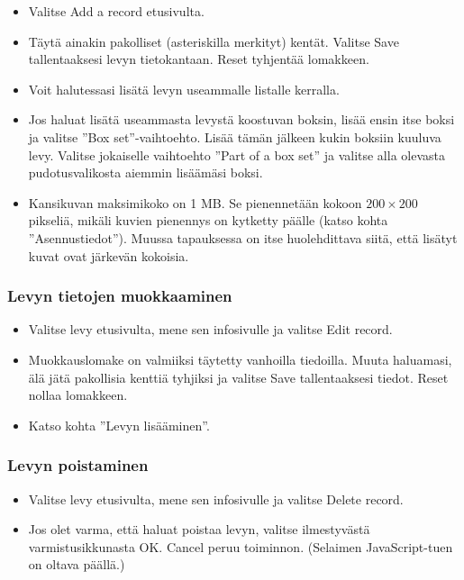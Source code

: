 \documentclass[a4paper,12pt]{report}
\begin{document}
\begin{itemize}
  \item Valitse Add a record etusivulta.
  \item Täytä ainakin pakolliset (asteriskilla merkityt) kentät. Valitse
    Save tallentaaksesi levyn tietokantaan. Reset tyhjentää lomakkeen.
  \item Voit halutessasi lisätä levyn useammalle listalle kerralla.
  \item Jos haluat lisätä useammasta levystä koostuvan boksin, lisää
    ensin itse boksi ja valitse ''Box set''-vaihtoehto. Lisää tämän
    jälkeen kukin boksiin kuuluva levy. Valitse jokaiselle vaihtoehto
    ''Part of a box set'' ja valitse alla olevasta pudotusvalikosta
    aiemmin lisäämäsi boksi.
  \item Kansikuvan maksimikoko on 1 MB. Se pienennetään kokoon
    $200\times200$ pikseliä, mikäli kuvien pienennys on kytketty päälle
    (katso kohta ''Asennustiedot''). Muussa tapauksessa on itse
    huolehdittava siitä, että lisätyt kuvat ovat järkevän kokoisia.
\end{itemize}
		
\subsubsection{Levyn tietojen muokkaaminen}

\begin{itemize}
  \item Valitse levy etusivulta, mene sen infosivulle ja valitse Edit
    record.
  \item Muokkauslomake on valmiiksi täytetty vanhoilla tiedoilla. Muuta
    haluamasi, älä jätä pakollisia kenttiä tyhjiksi ja valitse Save
    tallentaaksesi tiedot. Reset nollaa lomakkeen.
  \item Katso kohta ''Levyn lisääminen''.
\end{itemize}

\subsubsection{Levyn poistaminen}

\begin{itemize}
  \item Valitse levy etusivulta, mene sen infosivulle ja valitse Delete record.
  \item Jos olet varma, että haluat poistaa levyn, valitse ilmestyvästä
    varmistusikkunasta OK. Cancel peruu toiminnon. (Selaimen JavaScript-tuen
    on oltava päällä.)
\end{itemize}
	
\end{document}

